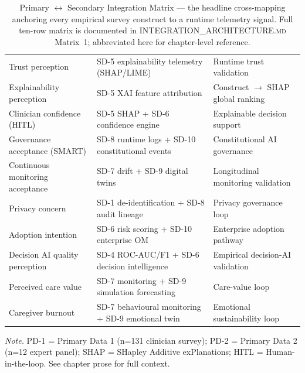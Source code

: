 {\tablestripes\tablefontsize
{}
\begin{xltabular}{\textwidth}{@{} >{\raggedright\arraybackslash}p{3.7cm} >{\raggedright\arraybackslash}p{3.7cm} L @{}}
\caption[Primary $\leftrightarrow$ Secondary Integration Matrix (Headline)]{Primary $\leftrightarrow$ Secondary Integration Matrix --- the headline cross-mapping anchoring every empirical survey construct to a runtime telemetry signal. Full ten-row matrix is documented in \textsc{INTEGRATION\_ARCHITECTURE.md} Matrix~1; abbreviated here for chapter-level reference.}\label{tab:primary_secondary_integration} \\
\toprule
{} &  &  \\
\midrule
\endfirsthead
\endhead
\bottomrule
\endlastfoot
Trust perception & SD-5 explainability telemetry (SHAP/LIME) & Runtime trust validation \\
Explainability perception & SD-5 XAI feature attribution & Construct $\to$ SHAP global ranking \\
Clinician confidence (HITL) & SD-5 SHAP + SD-6 confidence engine & Explainable decision support \\
Governance acceptance (SMART) & SD-8 runtime logs + SD-10 constitutional events & Constitutional AI governance \\
Continuous monitoring acceptance & SD-7 drift + SD-9 digital twins & Longitudinal monitoring validation \\
Privacy concern & SD-1 de-identification + SD-8 audit lineage & Privacy governance loop \\
Adoption intention & SD-6 risk scoring + SD-10 enterprise OM & Enterprise adoption pathway \\
Decision AI quality perception & SD-4 ROC-AUC/F1 + SD-6 decision intelligence & Empirical decision-AI validation \\
Perceived care value & SD-7 monitoring + SD-9 simulation forecasting & Care-value loop \\
Caregiver burnout & SD-7 behavioural monitoring + SD-9 emotional twin & Emotional sustainability loop \\
\end{xltabular}}
\vspace{0.3em}\noindent\textit{Note.} PD-1 = Primary Data 1 (n=131 clinician survey); PD-2 = Primary Data 2 (n=12 expert panel); SHAP = SHapley Additive exPlanations; HITL = Human-in-the-loop. See chapter prose for full context.

